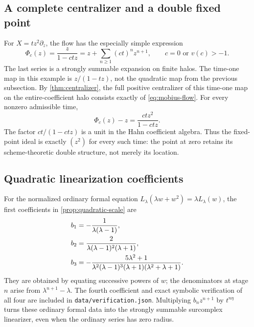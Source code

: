 \documentclass[11pt,letterpaper]{article}
\theoremstyle{definition}
\theoremstyle{remark}
\numberwithin{equation}{section}
\begin{document}
\subsection{A complete centralizer and a double fixed point}
For $X=tz^2\partial_z$, the flow has the especially simple expression
\begin{equation}\label{eq:mobius-flow}
 \Phi_c(z)=\frac{z}{1-ctz}
          =z+\sum_{n\ge1}(ct)^n z^{n+1},\qquad
 c=0\text{ or }v(c)>-1.
\end{equation}
The last series is a strongly summable expansion on finite halos. The time-one
map in this example is $z/(1-tz)$, not the quadratic map from the previous
subsection. By \cref{thm:centralizer}, the full positive centralizer of this
time-one map on the entire-coefficient halo consists exactly of
\eqref{eq:mobius-flow}. For every nonzero admissible time,
\[
 \Phi_c(z)-z=\frac{ctz^2}{1-ctz}.
\]
The factor $ct/(1-ctz)$ is a unit in the Hahn coefficient algebra. Thus the
fixed-point ideal is exactly $(z^2)$ for every such time: the point at zero
retains its scheme-theoretic double structure, not merely its location.

\subsection{Quadratic linearization coefficients}
For the normalized ordinary formal equation
$L_\lambda(\lambda w+w^2)=\lambda L_\lambda(w)$, the first coefficients
in \cref{prop:quadratic-scale} are
\begin{align}\label{eq:quadratic-bs}
 b_1&=-\frac1{\lambda(\lambda-1)},\\
 b_2&=\frac2{\lambda(\lambda-1)^2(\lambda+1)},\notag\\
 b_3&=-\frac{5\lambda^2+1}
 {\lambda^2(\lambda-1)^3(\lambda+1)(\lambda^2+\lambda+1)}.\notag
\end{align}
They are obtained by equating successive powers of $w$; the denominators
at stage $n$ arise from $\lambda^{n+1}-\lambda$. The fourth coefficient
and exact symbolic verification of all four are included in
\texttt{data/verification.json}. Multiplying $b_nz^{n+1}$ by $t^{n\eta}$
turns these ordinary formal data into the strongly summable surcomplex
linearizer, even when the ordinary series has zero radius.
\end{document}
